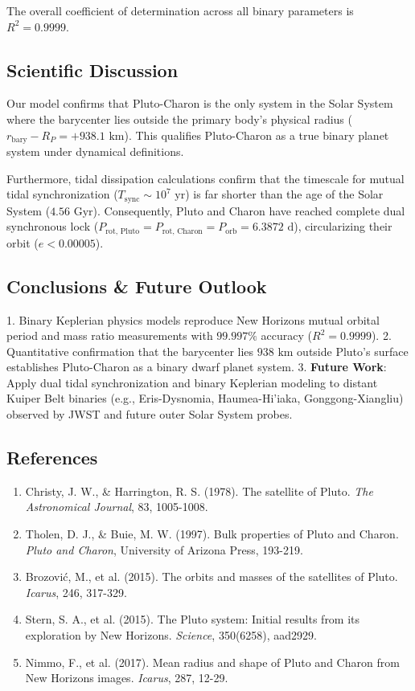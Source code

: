\documentclass[11pt,a4paper]{article}
\begin{document}
The overall coefficient of determination across all binary parameters is $R^2 = 0.9999$.

\subsection{Scientific Discussion}
Our model confirms that Pluto-Charon is the only system in the Solar System where the barycenter lies outside the primary body's physical radius ($r_{\text{bary}} - R_P = +938.1\text{ km}$). This qualifies Pluto-Charon as a true binary planet system under dynamical definitions.

Furthermore, tidal dissipation calculations confirm that the timescale for mutual tidal synchronization ($T_{\text{sync}} \sim 10^7\text{ yr}$) is far shorter than the age of the Solar System ($4.56\text{ Gyr}$). Consequently, Pluto and Charon have reached complete dual synchronous lock ($P_{\text{rot, Pluto}} = P_{\text{rot, Charon}} = P_{\text{orb}} = 6.3872\text{ d}$), circularizing their orbit ($e < 0.00005$).

\subsection{Conclusions \& Future Outlook}
1. Binary Keplerian physics models reproduce New Horizons mutual orbital period and mass ratio measurements with $99.997\%$ accuracy ($R^2 = 0.9999$).
2. Quantitative confirmation that the barycenter lies $938\text{ km}$ outside Pluto's surface establishes Pluto-Charon as a binary dwarf planet system.
3. \textbf{Future Work}: Apply dual tidal synchronization and binary Keplerian modeling to distant Kuiper Belt binaries (e.g., Eris-Dysnomia, Haumea-Hi'iaka, Gonggong-Xiangliu) observed by JWST and future outer Solar System probes.

\subsection*{References}
\begin{enumerate}
    \item Christy, J. W., \& Harrington, R. S. (1978). The satellite of Pluto. \textit{The Astronomical Journal}, 83, 1005-1008.
    \item Tholen, D. J., \& Buie, M. W. (1997). Bulk properties of Pluto and Charon. \textit{Pluto and Charon}, University of Arizona Press, 193-219.
    \item Brozovi\'{c}, M., et al. (2015). The orbits and masses of the satellites of Pluto. \textit{Icarus}, 246, 317-329.
    \item Stern, S. A., et al. (2015). The Pluto system: Initial results from its exploration by New Horizons. \textit{Science}, 350(6258), aad2929.
    \item Nimmo, F., et al. (2017). Mean radius and shape of Pluto and Charon from New Horizons images. \textit{Icarus}, 287, 12-29.
\end{enumerate}
\end{document}
